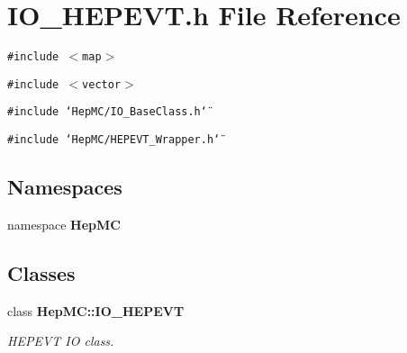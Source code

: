 \section{IO\_\-HEPEVT.h File Reference}
\label{IO__HEPEVT_8h}
{\tt \#include $<$map$>$}\par
{\tt \#include $<$vector$>$}\par
{\tt \#include \char`\"{}Hep\-MC/IO\_\-Base\-Class.h\char`\"{}}\par
{\tt \#include \char`\"{}Hep\-MC/HEPEVT\_\-Wrapper.h\char`\"{}}\par
\subsection*{Namespaces}
\begin{CompactItemize}
\item 
namespace {\bf Hep\-MC}
\end{CompactItemize}
\subsection*{Classes}
\begin{CompactItemize}
\item 
class {\bf Hep\-MC::IO\_\-HEPEVT}
\begin{CompactList}\small\item\em HEPEVT IO class. \item\end{CompactList}\end{CompactItemize}
